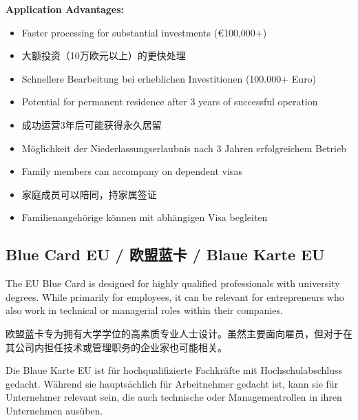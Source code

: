 \textbf{Application Advantages:}
\begin{itemize}
    \item Faster processing for substantial investments (€100,000+)
    \item 大额投资（10万欧元以上）的更快处理
    \item Schnellere Bearbeitung bei erheblichen Investitionen (100.000+ Euro)
    \item Potential for permanent residence after 3 years of successful operation
    \item 成功运营3年后可能获得永久居留
    \item Möglichkeit der Niederlassungserlaubnis nach 3 Jahren erfolgreichem Betrieb
    \item Family members can accompany on dependent visas
    \item 家庭成员可以陪同，持家属签证
    \item Familienangehörige können mit abhängigen Visa begleiten
\end{itemize}

\subsection{Blue Card EU / 欧盟蓝卡 / Blaue Karte EU}

The EU Blue Card is designed for highly qualified professionals with university degrees. While primarily for employees, it can be relevant for entrepreneurs who also work in technical or managerial roles within their companies.

欧盟蓝卡专为拥有大学学位的高素质专业人士设计。虽然主要面向雇员，但对于在其公司内担任技术或管理职务的企业家也可能相关。

Die Blaue Karte EU ist für hochqualifizierte Fachkräfte mit Hochschulabschluss gedacht. Während sie hauptsächlich für Arbeitnehmer gedacht ist, kann sie für Unternehmer relevant sein, die auch technische oder Managementrollen in ihren Unternehmen ausüben.

